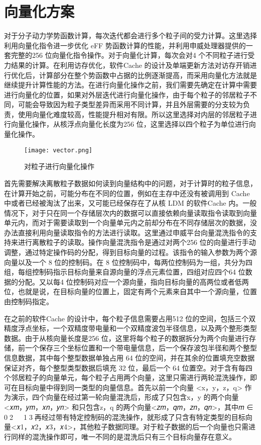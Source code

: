 \section{向量化方案}
对于分子动力学势函数计算，每次迭代都会进行多个粒子间的受力计算。这里选择利用向量化指令进一步优化 eFF 势函数计算的性能，并利用申威处理器提供的一套完整的256 位向量化指令操作。对于向量化计算，每次会对4 个不同粒子进行受力结果的计算。在利用访存优化，软件Cache 的设计及单端更新方法对访存开销进行优化后，计算部分在整个势函数中占据的比例逐渐提高，而采用向量化方法就是继续提升计算性能的方法。在进行向量化操作之前，我们需要先确定在计算中需要进行向量化的位置，如果对外层迭代进行向量化操作，由于每个粒子的邻居粒子不同，可能会导致因为粒子类型差异而采用不同计算，并且外层需要的分支较为负责，使用向量化难度较高，性能提升相对有限。所以这里选择对内层的邻居粒子进行向量化操作，从核浮点向量化长度为256 位，这里选择以四个粒子为单位进行向量化操作。

 \begin{figure}[h]
  \centering
  \texttt{[image: vector.png]}
  \caption{对粒子进行向量化操作}
\end{figure}

首先需要解决离散粒子数据如何读到向量结构中的问题，对于计算时的粒子信息，在计算开始之前，可能分布在不同的位置，例如在主存中还没有被调用到 Cache 中或者已经被淘汰了出来，又可能已经保存在了从核 LDM 的软件Cache 内。一般情况下，对于只在同一个存储层次内的数据可以直接依赖向量读取指令读取到向量单元内，而对于需要读取到一个向量单元内之前却分布在不同存储层次的数据，没办法直接利用向量读取指令的方法进行读取。这里通过申威平台向量混洗指令的支持来进行离散粒子的读取。操作向量混洗指令是通过对两个256 位的向量进行手动调整，通过特定操作码的分配，得到目标向量的过程。该指令的输入参数为两个源向量以及一个 8 位的控制码。在 8 位控制码中，每两位控制码为一组，共分为四组，每组控制码指示目标向量来自源向量的浮点元素位置，四组对应四个64 位数据的分配。又以每4 位控制码对应一个源向量，指向目标向量的高两位或者低两位，也就是说，在目标向量的位置上，固定有两个元素来自其中一个源向量，位置由控制码指定。

在之前的软件Cache 的设计中，每个粒子信息需要占用512 位的空间，包括三个双精度浮点坐标，一个双精度带电量和一个双精度波包半径信息，以及两个整形类型数据。由于从核向量长度是256 位，这里将每个粒子的数据拆分为两个向量进行存储，前一个保存三个坐标位置和一个带电量信息，后一个保存波包半径和两个整型信息数据，其中每个整型数据单独占用 64 位的空间，并在其余的位置填充空数据保证对齐，每个整型类型数据后填充 32 位，最后一个 64 位置空。对于含有每四个邻居粒子的向量单元，每个粒子占用两个向量，这里只需进行两轮混洗操作，即可在目标向量中得到同一类型的向量信息。首先以前一个向量 <x，y，z，q> 作为演示，四个向量在经过第一轮向量混洗后，形成了只包含x，y 的两个向量<𝑥𝑚，𝑦𝑚，𝑥𝑛，𝑦𝑛> 和只包含z，q 的两个向量<𝑧𝑚，𝑞𝑚，𝑧𝑛，𝑞𝑛>，其中𝑚 ∈ 0􀀁2􀀁𝑛 ∈ 1􀀁3，再经过带有特定控制码的混洗操作，就形成了只含有特定类型的目标向量<𝑥1，𝑥2，𝑥3，𝑥4>，其他粒子数据同理。对于粒子数据的后一个向量也只需进行同样的混洗操作即可，唯一不同的是混洗后只有三个目标向量存在意义。

